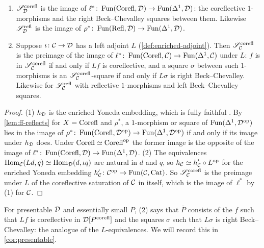 \begin{prop}
\label{prop:saturation-L}
%
\leavevmode
\begin{enumerate}
\item
$\mathscr{S}^{\mathrm{corefl}}_{\mathcal{D}}$
is the image of
$\ell^{*}\colon \operatorname{Fun}(\mathrm{Corefl},\mathcal{D}) \to \operatorname{Fun}(\Delta^{1},\mathcal{D})$:
the coreflective $1$-morphisms and the right Beck--Chevalley squares between
them. Likewise
$\mathscr{S}^{\mathrm{refl}}_{\mathcal{D}}$
is the image of
$\rho^{*}\colon \operatorname{Fun}(\mathrm{Refl},\mathcal{D}) \to \operatorname{Fun}(\Delta^{1},\mathcal{D})$.
\item Suppose
$\iota\colon \mathcal{C} \to \mathcal{D}$
has a left adjoint $L$ (\cref{def:enriched-adjoint}). Then
$\mathscr{S}^{\mathrm{corefl}}_{\mathcal{C}}$
is the preimage of the image of
$\ell^{*}\colon \operatorname{Fun}(\mathrm{Corefl},\mathcal{C}) \to \operatorname{Fun}(\Delta^{1},\mathcal{C})$
under $L$: $f$ is in
$\mathscr{S}^{\mathrm{corefl}}_{\mathcal{C}}$
if and only if $Lf$ is coreflective, and a square $\sigma$ between such
$1$-morphisms is an
$\mathscr{S}^{\mathrm{corefl}}_{\mathcal{C}}$-square
if and only if $L\sigma$ is right Beck--Chevalley. Likewise for
$\mathscr{S}^{\mathrm{refl}}_{\mathcal{C}}$
with reflective $1$-morphisms and left Beck--Chevalley squares.
\end{enumerate}
\end{prop}

\begin{proof}
%
(1) $h_{\mathcal{D}}$ is the enriched Yoneda embedding,
which is fully faithful \cite{hinich2020yoneda,heine2023enriched}.
By \cref{lem:ff-reflects} for $X = \mathrm{Corefl}$ and $\rho^{*}$,
a $1$-morphism or square of
$\operatorname{Fun}(\Delta^{1},\mathcal{D}^{\mathrm{op}})$
lies in the image of
$\rho^{*}\colon \operatorname{Fun}(\mathrm{Corefl},\mathcal{D}^{\mathrm{op}}) \to \operatorname{Fun}(\Delta^{1},\mathcal{D}^{\mathrm{op}})$
if and only if its image under $h_{\mathcal{D}}$ does. Under
$\mathrm{Corefl} \simeq \mathrm{Corefl}^{\mathrm{op}}$
the former image is the opposite of the image of
$\ell^{*}\colon \operatorname{Fun}(\mathrm{Corefl},\mathcal{D}) \to \operatorname{Fun}(\Delta^{1},\mathcal{D})$.
(2) The equivalences
$\operatorname{Hom}_{\mathcal{C}}(Ld,q) \simeq \operatorname{Hom}_{\mathcal{D}}(d,\iota q)$
are natural in $d$ and $q$, so
$h_{\mathcal{C}} \simeq h'_{\mathcal{C}} \circ L^{\mathrm{op}}$
for the enriched Yoneda embedding
$h'_{\mathcal{C}}\colon \mathcal{C}^{\mathrm{op}} \to \operatorname{Fun}(\mathcal{C},\mathrm{Cat})$.
So
$\mathscr{S}^{\mathrm{corefl}}_{\mathcal{C}}$
is the preimage under $L$ of the coreflective saturation of $\mathcal{C}$ in itself,
which is the image of $\ell^{*}$ by (1) for $\mathcal{C}$.
\end{proof}

%
For presentable $\mathcal{D}$ and essentially small $P$,
(2) says that $\overline{P}$ consists of the $f$ such that $Lf$ is coreflective
in $\mathcal{D}[{P}^{\mathrm{corefl}}]$ and the squares $\sigma$ such that $L\sigma$ is right
Beck--Chevalley: the analogue of the $L$-equivalences.
We will record this in \cref{cor:presentable}.

